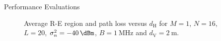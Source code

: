 \documentclass[journal]{IEEEtran}
\begin{document}
\begin{section}{Performance Evaluations}
		\begin{figure}[!t]
			\centering
			\caption{Average R-E region and path loss versus $d_{\mathrm{H}}$ for $M=1$, $N=16$, $L=20$, $\sigma_n^2=\SI{-40}{\dBm}$, $B=\SI{1}{\MHz}$ and $d_{\mathrm{V}}=\SI{2}{\meter}$.}
		\end{figure}


\end{section}
\end{document}
